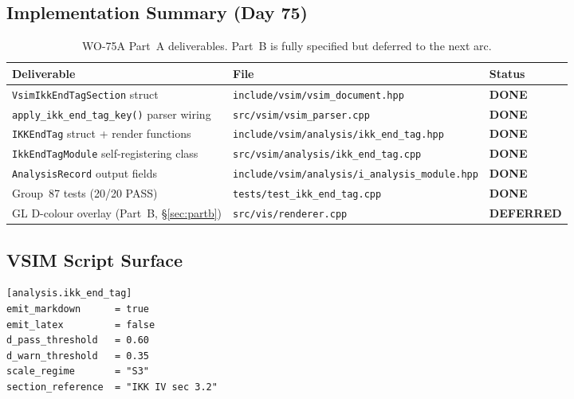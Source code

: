 \documentclass[11pt,a4paper]{article}
\theoremstyle{definition}
\begin{document}
\subsection{Implementation Summary (Day 75)}

\begin{table}[H]
\centering\small
\begin{tabular}{@{}lll@{}}
\toprule
Deliverable & File & Status \\
\midrule
\texttt{VsimIkkEndTagSection} struct
  & \texttt{include/vsim/vsim\_document.hpp}
  & \textcolor{vsimgreen}{\textbf{DONE}} \\
\texttt{apply\_ikk\_end\_tag\_key()} parser wiring
  & \texttt{src/vsim/vsim\_parser.cpp}
  & \textcolor{vsimgreen}{\textbf{DONE}} \\
\texttt{IKKEndTag} struct + render functions
  & \texttt{include/vsim/analysis/ikk\_end\_tag.hpp}
  & \textcolor{vsimgreen}{\textbf{DONE}} \\
\texttt{IkkEndTagModule} self-registering class
  & \texttt{src/vsim/analysis/ikk\_end\_tag.cpp}
  & \textcolor{vsimgreen}{\textbf{DONE}} \\
\texttt{AnalysisRecord} output fields
  & \texttt{include/vsim/analysis/i\_analysis\_module.hpp}
  & \textcolor{vsimgreen}{\textbf{DONE}} \\
Group~87 tests (20/20 PASS)
  & \texttt{tests/test\_ikk\_end\_tag.cpp}
  & \textcolor{vsimgreen}{\textbf{DONE}} \\
\midrule
GL D-colour overlay (Part~B, \S\ref{sec:partb})
  & \texttt{src/vis/renderer.cpp}
  & \textcolor{vsimamber}{\textbf{DEFERRED}} \\
\bottomrule
\end{tabular}
\caption{WO-75A Part~A deliverables. Part~B is fully specified but deferred to the next arc.}
\end{table}

\subsection{VSIM Script Surface}

\begin{lstlisting}[style=eventprint,
  caption={\texttt{[analysis.ikk\_end\_tag]} block in a \texttt{.vsim} script.}]
[analysis.ikk_end_tag]
emit_markdown      = true
emit_latex         = false
d_pass_threshold   = 0.60
d_warn_threshold   = 0.35
scale_regime       = "S3"
section_reference  = "IKK IV sec 3.2"
\end{lstlisting}
\end{document}
